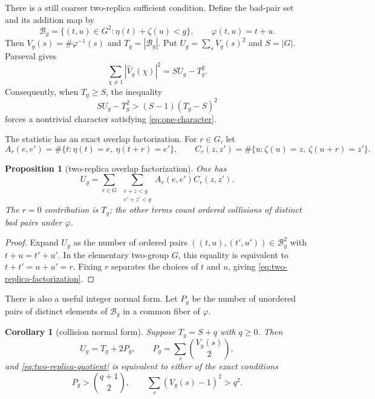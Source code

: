\documentclass[11pt]{article}
\newtheorem{proposition}[theorem]{Proposition}
\newtheorem{corollary}[theorem]{Corollary}
\theoremstyle{definition}
\theoremstyle{remark}
\begin{document}
There is a still coarser two-replica sufficient condition.  Define the
bad-pair set and its addition map by
\[
 \mathcal B_g=\{(t,u)\in G^2:\eta(t)+\zeta(u)<g\},
 \qquad \varphi(t,u)=t+u.
\]
Then $V_g(s)=\#\varphi^{-1}(s)$ and $T_g=|\mathcal B_g|$.  Put
$U_g=\sum_sV_g(s)^2$ and $S=|G|$.  Parseval gives
\[
 \sum_{\chi\ne1}|\widehat V_g(\chi)|^2=SU_g-T_g^2.
\]
Consequently, when $T_g\ge S$, the inequality
\begin{equation}\label{eq:two-replica-quotient}
 SU_g-T_g^2>(S-1)(T_g-S)^2
\end{equation}
forces a nontrivial character satisfying \eqref{eq:one-character}.

The statistic has an exact overlap factorization.  For $r\in G$, let
\[
 A_r(e,e')=\#\{t:\eta(t)=e,\ \eta(t+r)=e'\},
 \qquad
 C_r(z,z')=\#\{u:\zeta(u)=z,\ \zeta(u+r)=z'\}.
\]

\begin{proposition}[two-replica overlap factorization]
\label{prop:two-replica-factorization}
One has
\begin{equation}\label{eq:two-replica-factorization}
 U_g=\sum_{r\in G}\ \sum_{\substack{e+z<g\\e'+z'<g}}
 A_r(e,e')C_r(z,z').
\end{equation}
The $r=0$ contribution is $T_g$; the other terms count ordered collisions
of distinct bad pairs under $\varphi$.
\end{proposition}

\begin{proof}
Expand $U_g$ as the number of ordered pairs
$((t,u),(t',u'))\in\mathcal B_g^2$ with $t+u=t'+u'$.  In the elementary
two-group $G$, this equality is equivalent to
$t+t'=u+u'=r$.  Fixing $r$ separates the choices of $t$ and $u$, giving
\eqref{eq:two-replica-factorization}.
\end{proof}

There is also a useful integer normal form.  Let $P_g$ be the number of
unordered pairs of distinct elements of $\mathcal B_g$ in a common fiber of
$\varphi$.

\begin{corollary}[collision normal form]\label{cor:collision-normal-form}
Suppose $T_g=S+q$ with $q\ge0$.  Then
\[
 U_g=T_g+2P_g,
 \qquad
 P_g=\sum_s\binom{V_g(s)}2,
\]
and \eqref{eq:two-replica-quotient} is equivalent to either of the exact
conditions
\begin{equation}\label{eq:collision-normal-form}
 P_g>\binom{q+1}{2},
 \qquad
 \sum_s(V_g(s)-1)^2>q^2.
\end{equation}
\end{corollary}
\end{document}
